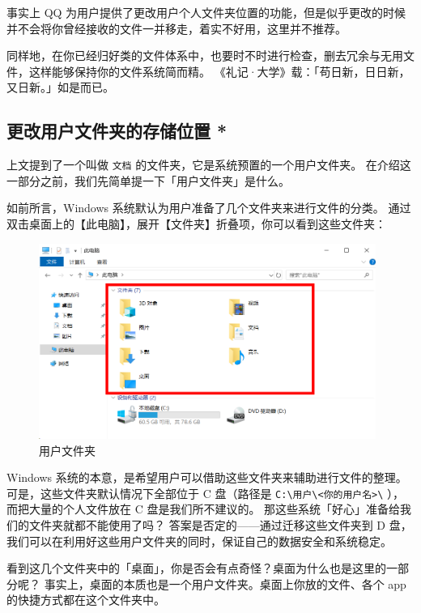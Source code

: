事实上 QQ 为用户提供了更改用户个人文件夹位置的功能，但是似乎更改的时候并不会将你曾经接收的文件一并移走，着实不好用，这里并不推荐。

同样地，在你已经归好类的文件体系中，也要时不时进行检查，删去冗余与无用文件，这样能够保持你的文件系统简而精。
《礼记·大学》载：「苟日新，日日新，又日新。」如是而已。

\subsection{更改用户文件夹的存储位置 *}

上文提到了一个叫做 \verb|文档| 的文件夹，它是系统预置的一个用户文件夹。
在介绍这一部分之前，我们先简单提一下「用户文件夹」是什么。

如前所言，Windows 系统默认为用户准备了几个文件夹来进行文件的分类。
通过双击桌面上的【此电脑】，展开【文件夹】折叠项，你可以看到这些文件夹：

\begin{figure}[htb!]
  \centering
  \includegraphics[width=11cm]{assets/User_directories.png}
  \caption{用户文件夹}
  \label{User_directories}
\end{figure}

Windows 系统的本意，是希望用户可以借助这些文件夹来辅助进行文件的整理。
可是，这些文件夹默认情况下全部位于 C 盘（路径是 \verb|C:\用户\<你的用户名>\| ），而把大量的个人文件放在 C 盘是我们所不建议的。
那这些系统「好心」准备给我们的文件夹就都不能使用了吗？
答案是否定的——通过迁移这些文件夹到 D 盘，我们可以在利用好这些用户文件夹的同时，保证自己的数据安全和系统稳定。

\begin{note}
  看到这几个文件夹中的「桌面」，你是否会有点奇怪？桌面为什么也是这里的一部分呢？
  事实上，桌面的本质也是一个用户文件夹。桌面上你放的文件、各个 app 的快捷方式都在这个文件夹中。
\end{note}

